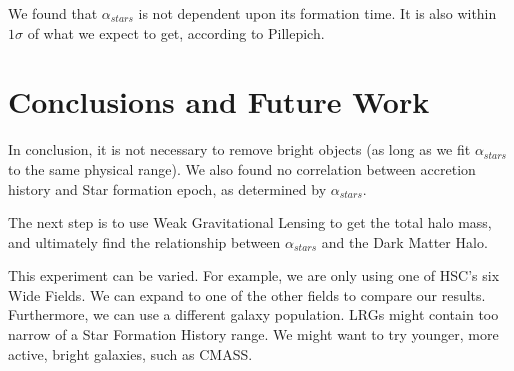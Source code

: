 \documentclass{article}
\begin{document}
We found that  $\alpha_{stars}$ is not dependent upon its formation time. It is also within $1\sigma$ of what we expect to get, according to Pillepich. 


\section{Conclusions and Future Work}

In conclusion, it is not necessary to remove bright objects (as long as we fit $\alpha_{stars}$ to the same physical range). We also found no correlation between accretion history and Star formation epoch, as determined by $\alpha_{stars}$. 

The next step is to use Weak Gravitational Lensing to get the total halo mass, and ultimately find the relationship between $\alpha_{stars}$ and the Dark Matter Halo.

This experiment can be varied. For example, we are only using one of HSC's six Wide Fields. We can expand to one of the other fields to compare our results. Furthermore, we can use a different galaxy population. LRGs might contain too narrow of a Star Formation History range. We might want to try younger, more active, bright galaxies, such as CMASS.

\clearpage


\nocite{*}
\end{document}
